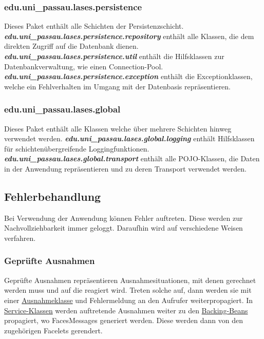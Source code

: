 \subsubsection{edu.uni\_passau.lases.persistence}\label{arch:persistence}
Dieses Paket enthält alle Schichten der Persistenzschicht.
\newline\newline
\textbf{\emph{edu.uni\_passau.lases.persistence.repository}}\label{arch:repository}
enthält alle Klassen, die dem direkten Zugriff auf die Datenbank dienen.
\newline\newline
\textbf{\emph{edu.uni\_passau.lases.persistence.util}}
enthält die Hilfsklassen zur Datenbankverwaltung, wie einen
Connection-Pool.
\newline\newline
\textbf{\emph{edu.uni\_passau.lases.persistence.exception}}
enthält die Exceptionklassen, welche ein Fehlverhalten im Umgang mit der
Datenbasis repräsentieren.

\subsubsection{edu.uni\_passau.lases.global}
Dieses Paket enthält alle Klassen welche über mehrere Schichten hinweg
verwendet werden.
\newline\newline
\textbf{\emph{edu.uni\_passau.lases.global.logging}}
enthält Hilfsklassen für schichtenübergreifende Loggingfunktionen.
\newline\newline
\textbf{\emph{edu.uni\_passau.lases.global.transport}}\label{arch:transport}
enthält alle POJO-Klassen, die Daten in der Anwendung repräsentieren und zu deren
Transport verwendet werden.


\subsection{Fehlerbehandlung}
Bei Verwendung der Anwendung können Fehler auftreten. Diese werden zur Nachvollziehbarkeit
immer geloggt. Daraufhin wird auf verschiedene Weisen verfahren.

\subsubsection{Geprüfte Ausnahmen}
Geprüfte Ausnahmen repräsentieren Ausnahmesituationen, mit
denen gerechnet werden muss und auf die reagiert wird.
Treten solche auf, dann werden sie mit einer
\hyperref[arch:busex]{Ausnahmeklasse} und Fehlermeldung
an den Aufrufer weiterpropagiert.
In \hyperref[arch:service]{Service-Klassen} werden auftretende Ausnahmen weiter zu den
\hyperref[arch:backing]{Backing-Beans} propagiert, wo FacesMessages %
generiert werden.
Diese werden dann von den zugehörigen Facelets %
gerendert.

